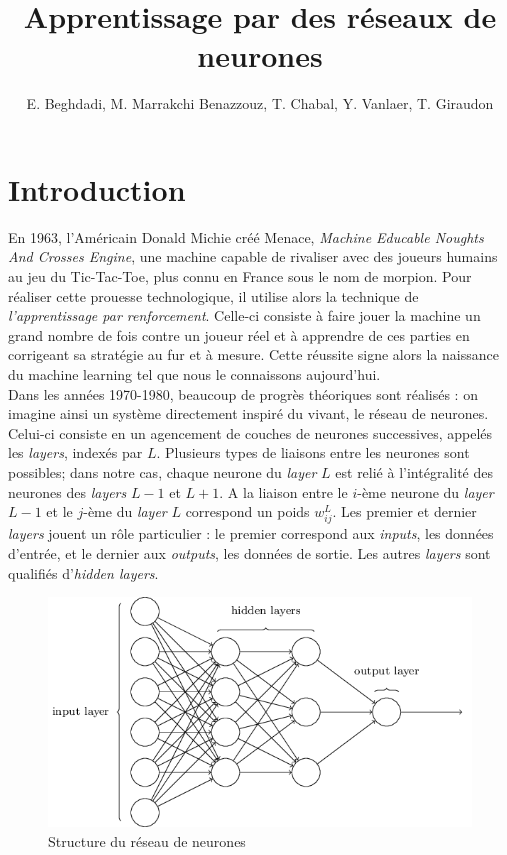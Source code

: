 \documentclass[a4paper,10pt]{article}
\title{Apprentissage par des réseaux de neurones}
\author{E. Beghdadi, M. Marrakchi Benazzouz, T. Chabal, Y. Vanlaer, T. Giraudon}
\begin{document}
\maketitle

\begin{abstract}

\end{abstract}

\section{Introduction}
En 1963, l'Américain Donald Michie créé Menace, \textit{Machine Educable Noughts And Crosses Engine},
une machine capable de rivaliser avec des joueurs humains au jeu du Tic-Tac-Toe, plus connu en France sous le nom de morpion.
Pour réaliser cette prouesse technologique, il utilise alors la technique de \textit{l'apprentissage par renforcement}.
Celle-ci consiste à faire jouer la machine un grand nombre de fois contre un joueur réel et à apprendre de ces parties
en corrigeant sa stratégie au fur et à mesure. Cette réussite signe alors la naissance du machine learning tel que
nous le connaissons aujourd'hui. \\
Dans les années 1970-1980, beaucoup de progrès théoriques sont réalisés : on imagine ainsi un système
directement inspiré du vivant, le réseau de neurones. Celui-ci consiste en un agencement de couches de neurones successives,
appelés les \textit{layers}, indexés par $L$. Plusieurs types de liaisons entre les neurones sont possibles; dans notre cas, chaque neurone du
\textit{layer} $L$ est relié à l'intégralité des neurones des \textit{layers} $L-1$ et $L+1$. A la liaison entre
le $i$-ème neurone du \textit{layer} $L-1$ et le $j$-ème du \textit{layer} $L$ correspond un poids $w^L_{ij}$. Les premier et dernier \textit{layers}
jouent un rôle particulier : le premier correspond aux \textit{inputs}, les données d'entrée, et le dernier aux \textit{outputs},
les données de sortie. Les autres \textit{layers} sont qualifiés d'\textit{hidden layers}.
\\

\begin{figure}[h]
\centering
\includegraphics[scale = 0.4]{layers}
\caption{Structure du réseau de neurones}
 
\end{figure}
\end{document}

